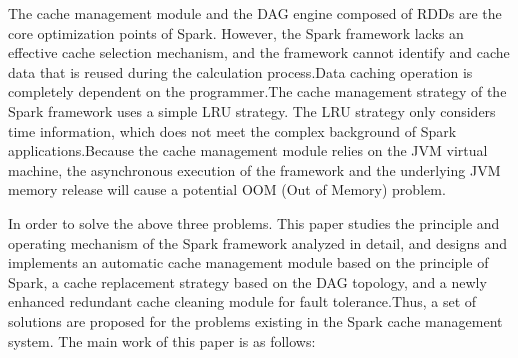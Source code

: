 The cache management module and the DAG engine composed of RDDs are the core optimization points of Spark. However, the Spark framework lacks an effective cache selection mechanism, and the framework cannot identify and cache data that is reused during the calculation process.Data caching operation is completely dependent on the programmer.The cache management strategy of the Spark framework uses a simple LRU strategy. The LRU strategy only considers time information, which does not meet the complex background of Spark applications.Because the cache management module relies on the JVM virtual machine, the asynchronous execution of the framework and the underlying JVM memory release will cause a potential OOM (Out of Memory) problem.

In order to solve the above three problems. This paper studies the principle and operating mechanism of the Spark framework analyzed in detail, and designs and implements an automatic cache management module based on the principle of Spark, a cache replacement strategy based on the DAG topology, and a newly enhanced redundant cache cleaning module for fault tolerance.Thus, a set of solutions are proposed for the problems existing in the Spark cache management system. The main work of this paper is as follows:

